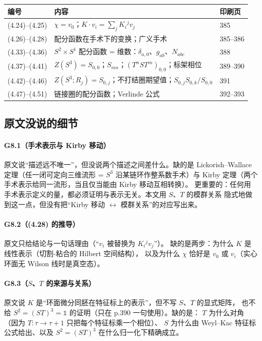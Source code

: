 \begin{center}
\small
\begin{tabular}{@{}p{1.5cm}p{8.6cm}p{2.2cm}@{}}
\toprule
编号 & 内容 & 印刷页 \\
\midrule
(4.24)--(4.25) & $\chi=v_0$；$K\cdot v_i=\sum_jK_i{}^jv_j$ & 385 \\
(4.26)--(4.28) & 配分函数在手术下的变换；广义手术 & 385--386 \\
(4.33)--(4.36) & $S^2\times S^1$ 配分函数 = 维数：$\delta_{a,0}$、$g_{ab}$、$N_{abc}$ & 388 \\
(4.37)--(4.41) & $Z(S^3)=S_{0,0}$；$S_{mn}$；$(T^nST^m)_{0,0}$；标架相位 & 389--390 \\
(4.42)--(4.46) & $Z(S^3;R_j)=S_{0,j}$；不打结圈期望值；$S_{0,j}S_{0,k}/S_{0,0}$ & 391 \\
(4.47)--(4.51) & 链接圈的配分函数；Verlinde 公式 & 392--393 \\
\bottomrule
\end{tabular}
\end{center}

\subsection{原文没说的细节}

\paragraph{G8.1（手术表示与 Kirby 移动）}
原文说“描述远不唯一”，但没说两个描述之间差什么。缺的是
Lickorish--Wallace 定理（任一闭可定向三维流形 = $S^3$ 沿某链环作整系数手术）与
Kirby 定理（两个手术表示给同一流形，当且仅当能由 Kirby 移动互相转换）。
更重要的：任何用手术表示定义的量，都必须证明与表示无关。本文用 $S$、$T$ 的模群关系
隐式地做到这一点，但没有把“Kirby 移动 $\leftrightarrow$ 模群关系”的对应写出来。

\paragraph{G8.2（(4.28) 的推导）}
原文只给结论与一句话理由（“$v_i$ 被替换为 $K_i{}^jv_j$”）。
缺的是两步：为什么 $K$ 是线性表示（切割-粘合的 Hilbert 空间结构），
以及为什么 $\chi$ 恰好是 $v_0$ 或 $v_i$（实心环面无 Wilson 线时是真空态）。

\paragraph{G8.3（$S$、$T$ 的来源与关系）}
原文说 $K$ 是“环面微分同胚在特征标上的表示”，但不写 $S$、$T$ 的显式矩阵，
也不给 $S^2=(ST)^3=\mathbb 1$ 的证明（只在 p.390 一句使用）。缺的是：
$T$ 为什么对角（因为 $T:\tau\to\tau+1$ 只把每个特征标乘一个相位）、
$S$ 为什么由 Weyl--Kac 特征标公式给出、以及 $S^2=(ST)^3$ 在什么归一化下精确成立。

